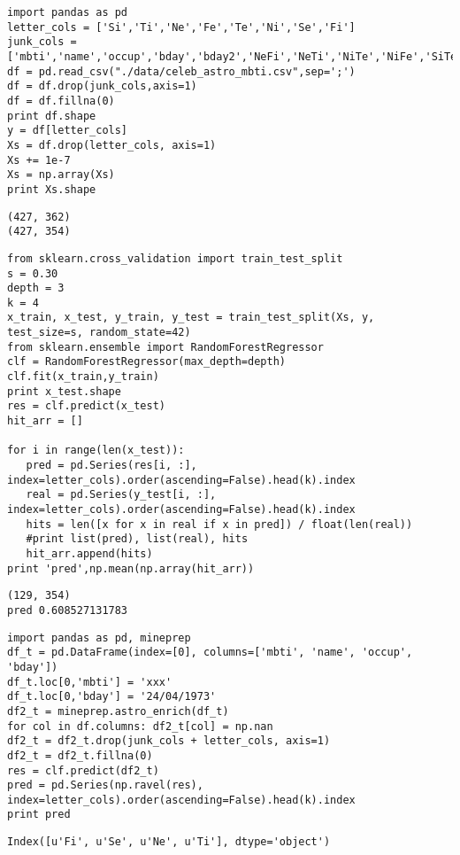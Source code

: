 \documentclass[12pt,fleqn]{article}\usepackage{../common}
\begin{document}
\begin{verbatim}
import pandas as pd
letter_cols = ['Si','Ti','Ne','Fe','Te','Ni','Se','Fi']
junk_cols = ['mbti','name','occup','bday','bday2','NeFi','NeTi','NiTe','NiFe','SiTe','SiFe','SeFi','SeTi']
df = pd.read_csv("./data/celeb_astro_mbti.csv",sep=';')
df = df.drop(junk_cols,axis=1)
df = df.fillna(0)
print df.shape
y = df[letter_cols]
Xs = df.drop(letter_cols, axis=1)
Xs += 1e-7
Xs = np.array(Xs)
print Xs.shape
\end{verbatim}

\begin{verbatim}
(427, 362)
(427, 354)
\end{verbatim}


\begin{verbatim}
from sklearn.cross_validation import train_test_split
s = 0.30
depth = 3
k = 4
x_train, x_test, y_train, y_test = train_test_split(Xs, y, test_size=s, random_state=42)
from sklearn.ensemble import RandomForestRegressor
clf = RandomForestRegressor(max_depth=depth)
clf.fit(x_train,y_train)
print x_test.shape
res = clf.predict(x_test)
hit_arr = []

for i in range(len(x_test)):
   pred = pd.Series(res[i, :], index=letter_cols).order(ascending=False).head(k).index    
   real = pd.Series(y_test[i, :], index=letter_cols).order(ascending=False).head(k).index    
   hits = len([x for x in real if x in pred]) / float(len(real))
   #print list(pred), list(real), hits
   hit_arr.append(hits)
print 'pred',np.mean(np.array(hit_arr))
\end{verbatim}

\begin{verbatim}
(129, 354)
pred 0.608527131783
\end{verbatim}

\begin{verbatim}
import pandas as pd, mineprep
df_t = pd.DataFrame(index=[0], columns=['mbti', 'name', 'occup', 'bday'])
df_t.loc[0,'mbti'] = 'xxx'
df_t.loc[0,'bday'] = '24/04/1973'
df2_t = mineprep.astro_enrich(df_t)
for col in df.columns: df2_t[col] = np.nan
df2_t = df2_t.drop(junk_cols + letter_cols, axis=1)
df2_t = df2_t.fillna(0)
res = clf.predict(df2_t)
pred = pd.Series(np.ravel(res), index=letter_cols).order(ascending=False).head(k).index    
print pred
\end{verbatim}

\begin{verbatim}
Index([u'Fi', u'Se', u'Ne', u'Ti'], dtype='object')
\end{verbatim}
\end{document}
